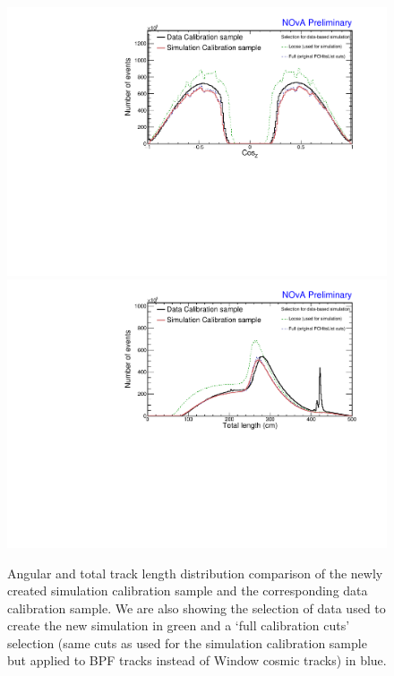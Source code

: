 \begin{figure}[!ht]
\includegraphics[width=\textwidth]{Plots/TBCalibration/DBSim_DataMCComparison_CosZ.pdf}
\includegraphics[width=\textwidth]{Plots/TBCalibration/DBSim_DataMCComparison_TotLength.pdf}
\caption[Data-Simulation comparison of angular and track length distributions]{Angular and total track length distribution comparison of the newly created simulation calibration sample and the corresponding data calibration sample. We are also showing the selection of data used to create the new simulation in green and a `full calibration cuts' selection (same cuts as used for the simulation calibration sample but applied to \acrshort{BPF} tracks instead of Window cosmic tracks) in blue.}
\label{fig:DataBasedSimDataMCComparison_cosZtotLength}
\end{figure}

